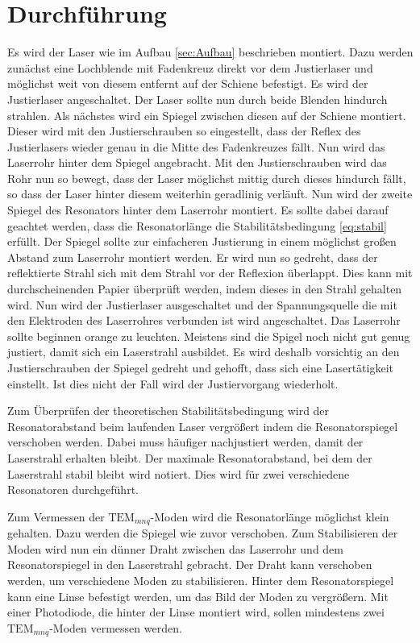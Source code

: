 
\section{Durchführung}
\label{sec:Durchführung}
Es wird der Laser wie im Aufbau \ref{sec:Aufbau} beschrieben montiert. Dazu werden zunächst eine Lochblende mit Fadenkreuz direkt vor dem Justierlaser und möglichst weit von diesem entfernt auf der Schiene befestigt. Es wird der Justierlaser angeschaltet. Der Laser sollte nun durch beide Blenden hindurch strahlen. Als nächstes wird ein Spiegel zwischen diesen auf der Schiene montiert. Dieser wird mit den Justierschrauben so eingestellt, dass der Reflex des Justierlasers wieder genau in die Mitte des Fadenkreuzes fällt. Nun wird das Laserrohr hinter dem Spiegel angebracht. Mit den Justierschrauben wird das Rohr nun so bewegt, dass der Laser möglichst mittig durch dieses hindurch fällt, so dass der Laser hinter diesem weiterhin geradlinig verläuft. Nun wird der zweite Spiegel des Resonators hinter dem Laserrohr montiert. Es sollte dabei darauf geachtet werden, dass die Resonatorlänge die Stabilitätsbedingung \eqref{eq:stabil} erfüllt. Der Spiegel sollte zur einfacheren Justierung in einem möglichst großen Abstand zum Laserrohr montiert werden. Er wird nun so gedreht, dass der reflektierte Strahl sich mit dem Strahl vor der Reflexion überlappt. Dies kann mit durchscheinenden Papier überprüft werden, indem dieses in den Strahl gehalten wird. Nun wird der Justierlaser ausgeschaltet und der Spannungsquelle die mit den Elektroden des Laserrohres verbunden ist wird angeschaltet. Das Laserrohr sollte beginnen orange zu leuchten. Meistens sind die Spigel noch nicht gut genug justiert, damit sich ein Laserstrahl ausbildet. Es wird deshalb vorsichtig an den Justierschrauben der Spiegel gedreht und gehofft, dass sich eine Lasertätigkeit einstellt. Ist dies nicht der Fall wird der Justiervorgang wiederholt. 

Zum Überprüfen der theoretischen Stabilitätsbedingung wird der Resonatorabstand beim laufenden Laser vergrößert indem die Resonatorspiegel verschoben werden. Dabei muss häufiger nachjustiert werden, damit der Laserstrahl erhalten bleibt. Der maximale Resonatorabstand, bei dem der Laserstrahl stabil bleibt wird notiert. Dies wird für zwei verschiedene Resonatoren durchgeführt.

Zum Vermessen der $\text{TEM}_{mnq}$-Moden wird die Resonatorlänge möglichst klein gehalten. Dazu werden die Spiegel wie zuvor verschoben. Zum Stabilisieren der Moden wird nun ein dünner Draht zwischen das Laserrohr und dem Resonatorspiegel in den Laserstrahl gebracht. Der Draht kann verschoben werden, um verschiedene Moden zu stabilisieren. Hinter dem Resonatorspiegel kann eine Linse befestigt werden, um das Bild der Moden zu vergrößern. Mit einer Photodiode, die hinter der Linse montiert wird, sollen mindestens zwei $\text{TEM}_{mnq}$-Moden vermessen werden.


